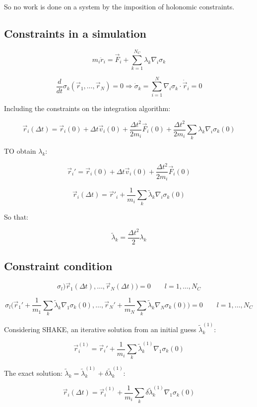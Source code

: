 	So no work is done on a system by the imposition of holonomic constraints.

	\subsection{Constraints in a simulation}

	$$m_i\ddot{r}_i = \vec{F}_i + \sum\limits_{k=1}^{N_C}\lambda_k\nabla_i\sigma_k$$

	$$\frac{d}{dt}\sigma_k(\vec{r}_1, \dots, \vec{r}_N) = 0\Rightarrow\dot{\sigma}_k = \sum\limits_{i=1}^N\nabla_i\sigma_k\cdot\dot{\vec{r}}_i = 0$$

	Including the constraints on the integration algorithm:

	$$\vec{r}_i(\Delta t) = \vec{r}_i(0) + \Delta t\vec{v}_i(0) + \frac{\Delta t^2}{2m_i}\vec{F}_i(0) + \frac{\Delta t^2}{2m_i}\sum\limits_{k}\lambda_k\nabla_i\sigma_k(0)$$

	TO obtain $\lambda_k$:

	$$\vec{r}_i' = \vec{r}_i(0) + \Delta t\vec{v}_i(0) + \frac{\Delta t^2}{2m_i}\vec{F}_i(0)$$

	$$\vec{r}_i(\Delta t) = \vec{r}'_i + \frac{1}{m_i}\sum\limits_k\tilde{\lambda}_k\nabla_i\sigma_k(0)$$

	So that:

	$$\tilde{\lambda}_k = \frac{\Delta t^2}{2}\lambda_k$$

	\subsection{Constraint condition}

	$$\sigma_l)\vec{r}_1(\Delta t), \dots, \vec{r}_N(\Delta t)) = 0\qquad l = 1, \dots, N_C$$

	$$\sigma_l\biggl(\vec{r}_1' + \frac{1}{m_1}\sum\limits_k\tilde{\lambda}_k\nabla_1\sigma_k(0), \dots, \vec{r}_N' + \frac{1}{m_N}\sum\limits_k\tilde{\lambda}_k\nabla_N\sigma_k(0)\biggr) = 0\qquad l = 1, \dots, N_C$$

	Considering SHAKE, an iterative solution from an initial guess $\tilde{\lambda}_k^{(1)}$:

	$$\vec{r}_i^{(1)} = \vec{r}_i' + \frac{1}{m_i}\sum\limits_k\tilde{\lambda}_k^{(1)}\nabla_1\sigma_k(0)$$

	The exact solution: $\tilde{\lambda}_k = \tilde{\lambda}_k^{(1)} + \delta\tilde{\lambda}_k^{(1)}$:

	$$\vec{r}_i(\Delta t) = \vec{r}_i^{(1)} + \frac{1}{m_i}\sum\limits_k\delta\tilde{\lambda}_k^{(1)}\nabla_1\sigma_k(0)$$

